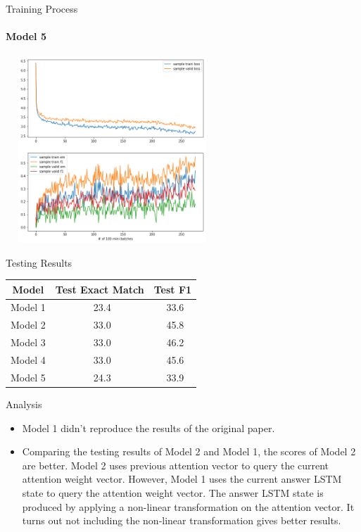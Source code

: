 \documentclass{beamer}
\begin{document}
\begin{frame}{Training Process}\framesubtitle{Model 5}
    \begin{center}
        \includegraphics[width=8cm, height=7cm]{figures/match_change3.png}
    \end{center}

\end{frame}

\begin{frame}{Testing Results}
    \begin{table}[htbp]\centering
      \begin{tabular}{|c|c|c|}
        \hline
        Model& Test Exact Match & Test F1 \\
        \hline\hline
        Model 1 & \ 23.4 &\ 33.6 \\
        Model 2 & \ 33.0 &\ 45.8 \\
        Model 3 & \ 33.0 &\ 46.2 \\
        Model 4 & \ 33.0 &\ 45.6 \\
        Model 5 & \ 24.3 &\ 33.9 \\
        \hline
      \end{tabular}
    \end{table}
\end{frame}

\begin{frame}{Analysis}
    \begin{itemize}
        \item Model 1 didn't reproduce the results of the original paper.
        \item Comparing the testing results of Model 2 and Model 1, the scores of Model 2 are better.  Model 2 uses previous attention vector to query the current attention weight vector. However, Model 1 uses the current answer LSTM state to query the attention weight vector. The answer LSTM state is produced by applying a non-linear transformation on the attention vector. It turns out not including the non-linear transformation gives better results.
    \end{itemize}
\end{frame}
\end{document}
